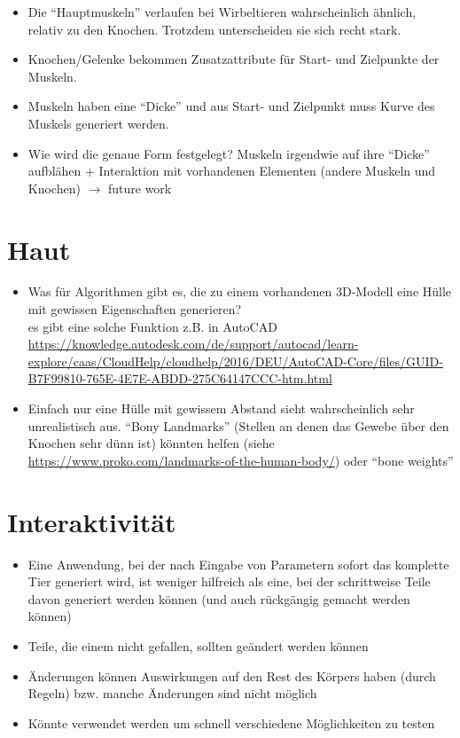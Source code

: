 \begin{itemize}
 \item Die "`Hauptmuskeln"' verlaufen bei Wirbeltieren wahrscheinlich ähnlich, relativ zu den Knochen. Trotzdem unterscheiden sie sich recht stark.
 \item Knochen/Gelenke bekommen Zusatzattribute für Start- und Zielpunkte der Muskeln.
 \item Muskeln haben eine "`Dicke"' und aus Start- und Zielpunkt muss Kurve des Muskels generiert werden.
 \item Wie wird die genaue Form festgelegt? Muskeln irgendwie auf ihre "`Dicke"' aufblähen + Interaktion mit vorhandenen Elementen (andere Muskeln und Knochen) $\rightarrow$ future work
\end{itemize}

\section{Haut}

\begin{itemize}
 \item Was für Algorithmen gibt es, die zu einem vorhandenen 3D-Modell eine Hülle mit gewissen Eigenschaften generieren? \\
 es gibt eine solche Funktion z.B. in AutoCAD \url{https://knowledge.autodesk.com/de/support/autocad/learn-explore/caas/CloudHelp/cloudhelp/2016/DEU/AutoCAD-Core/files/GUID-B7F99810-765E-4E7E-ABDD-275C64147CCC-htm.html}
 \item Einfach nur eine Hülle mit gewissem Abstand sieht wahrscheinlich sehr unrealistisch aus. "`Bony Landmarks"' (Stellen an denen das Gewebe über den Knochen sehr dünn ist) könnten helfen (siehe \url{https://www.proko.com/landmarks-of-the-human-body/}) oder "`bone weights"'
\end{itemize}

\section{Interaktivität}

\begin{itemize}
 \item Eine Anwendung, bei der nach Eingabe von Parametern sofort das komplette Tier generiert wird, ist weniger hilfreich als eine, bei der schrittweise Teile davon generiert werden können (und auch rückgängig gemacht werden können)
 \item Teile, die einem nicht gefallen, sollten geändert werden können
 \item Änderungen können Auswirkungen auf den Rest des Körpers haben (durch Regeln) bzw. manche Änderungen sind nicht möglich
 \item Könnte verwendet werden um schnell verschiedene Möglichkeiten zu testen
\end{itemize}

